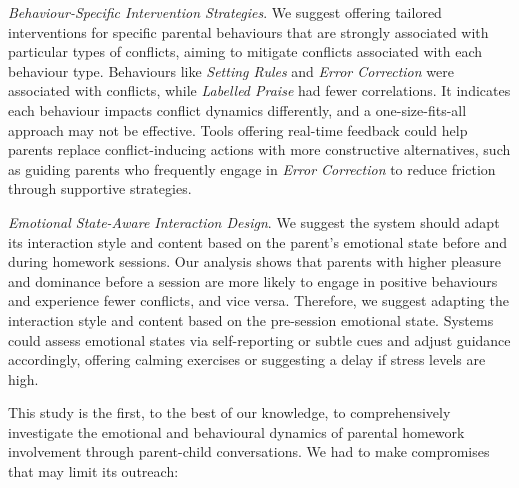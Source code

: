 \textit{Behaviour-Specific Intervention Strategies}.
We suggest offering tailored interventions for specific parental behaviours that are strongly associated with particular types of conflicts, aiming to mitigate conflicts associated with each behaviour type. 
Behaviours like \textit{Setting Rules} and \textit{Error Correction} were associated with conflicts, while \textit{Labelled Praise} had fewer correlations.
It indicates each behaviour impacts conflict dynamics differently, and a one-size-fits-all approach may not be effective.
Tools offering real-time feedback could help parents replace conflict-inducing actions with more constructive alternatives, such as guiding parents who frequently engage in \textit{Error Correction} to reduce friction through supportive strategies.


\textit{Emotional State-Aware Interaction Design}.
We suggest the system should adapt its interaction style and content based on the parent's emotional state before and during homework sessions.
Our analysis shows that parents with higher pleasure and dominance before a session are more likely to engage in positive behaviours and experience fewer conflicts, and vice versa.
Therefore, we suggest adapting the interaction style and content based on the pre-session emotional state. 
Systems could assess emotional states via self-reporting or subtle cues and adjust guidance accordingly, offering calming exercises or suggesting a delay if stress levels are high.



This study is the first, to the best of our knowledge, to comprehensively investigate the emotional and behavioural dynamics of parental homework involvement through parent-child conversations. We had to make compromises that may limit its outreach: 

